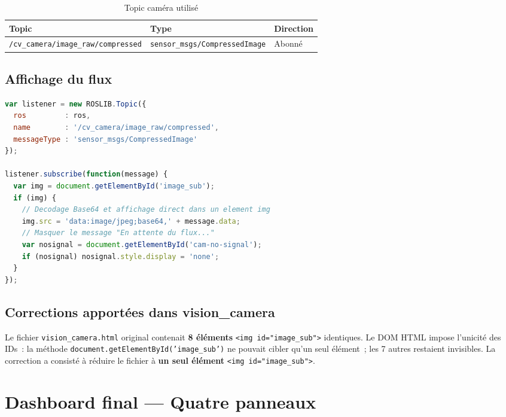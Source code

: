 \documentclass[12pt,a4paper]{report}
\begin{document}
\begin{table}[H]
\centering
\begin{tabularx}{\textwidth}{lll}
\toprule
\textbf{Topic} & \textbf{Type} & \textbf{Direction} \\
\midrule
\texttt{/cv\_camera/image\_raw/compressed} & \texttt{sensor\_msgs/CompressedImage} & Abonné \\
\bottomrule
\end{tabularx}
\caption{Topic caméra utilisé}
\end{table}

\subsection{Affichage du flux}

\begin{lstlisting}[language=JavaScript, caption={Réception et affichage du flux caméra}]
var listener = new ROSLIB.Topic({
  ros         : ros,
  name        : '/cv_camera/image_raw/compressed',
  messageType : 'sensor_msgs/CompressedImage'
});

listener.subscribe(function(message) {
  var img = document.getElementById('image_sub');
  if (img) {
    // Decodage Base64 et affichage direct dans un element img
    img.src = 'data:image/jpeg;base64,' + message.data;
    // Masquer le message "En attente du flux..."
    var nosignal = document.getElementById('cam-no-signal');
    if (nosignal) nosignal.style.display = 'none';
  }
});
\end{lstlisting}

\subsection{Corrections apportées dans vision\_camera}

\begin{warnbox}
Le fichier \texttt{vision\_camera.html} original contenait \textbf{8 éléments} \texttt{<img id="image\_sub">} identiques. Le DOM HTML impose l'unicité des IDs~: la méthode \texttt{document.getElementById('image\_sub')} ne pouvait cibler qu'un seul élément~; les 7 autres restaient invisibles. La correction a consisté à réduire le fichier à \textbf{un seul élément} \texttt{<img id="image\_sub">}.
\end{warnbox}

\section{Dashboard final — Quatre panneaux}
\end{document}
